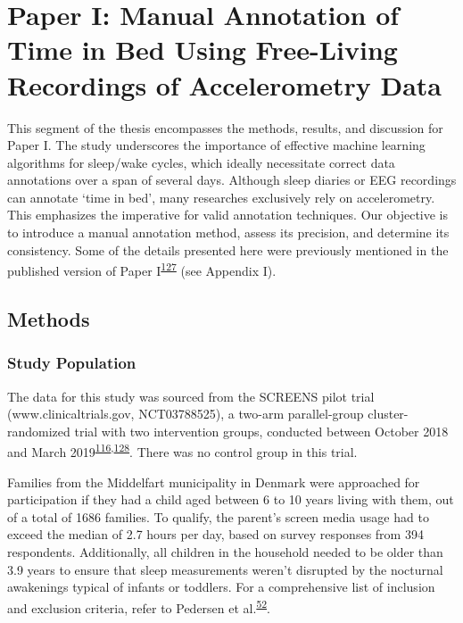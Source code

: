 \documentclass[
  10pt,
]{scrbook}
\begin{document}
\hypertarget{paper-i-manual-annotation-of-time-in-bed-using-free-living-recordings-of-accelerometry-data}{%
\chapter{Paper I: Manual Annotation of Time in Bed Using Free-Living
Recordings of Accelerometry
Data}\label{paper-i-manual-annotation-of-time-in-bed-using-free-living-recordings-of-accelerometry-data}}

This segment of the thesis encompasses the methods, results, and
discussion for Paper I. The study underscores the importance of
effective machine learning algorithms for sleep/wake cycles, which
ideally necessitate correct data annotations over a span of several
days. Although sleep diaries or EEG recordings can annotate `time in
bed', many researches exclusively rely on accelerometry. This emphasizes
the imperative for valid annotation techniques. Our objective is to
introduce a manual annotation method, assess its precision, and
determine its consistency. Some of the details presented here were
previously mentioned in the published version of Paper
I\textsuperscript{\protect\hyperlink{ref-skovgaard_manual_2021}{127}}
(see Appendix I).

\hypertarget{methods}{%
\section{Methods}\label{methods}}

\hypertarget{study-population}{%
\subsection{Study Population}\label{study-population}}

The data for this study was sourced from the SCREENS pilot trial
(www.clinicaltrials.gov, NCT03788525), a two-arm parallel-group
cluster-randomized trial with two intervention groups, conducted between
October 2018 and March
2019\textsuperscript{\protect\hyperlink{ref-rasmussen_short-term_2020}{116},\protect\hyperlink{ref-rasmussen_feasibility_2021}{128}}.
There was no control group in this trial.

Families from the Middelfart municipality in Denmark were approached for
participation if they had a child aged between 6 to 10 years living with
them, out of a total of 1686 families. To qualify, the parent's screen
media usage had to exceed the median of 2.7 hours per day, based on
survey responses from 394 respondents. Additionally, all children in the
household needed to be older than 3.9 years to ensure that sleep
measurements weren't disrupted by the nocturnal awakenings typical of
infants or toddlers. For a comprehensive list of inclusion and exclusion
criteria, refer to Pedersen et
al.\textsuperscript{\protect\hyperlink{ref-pedersen_self-administered_2021}{52}}.
\end{document}
